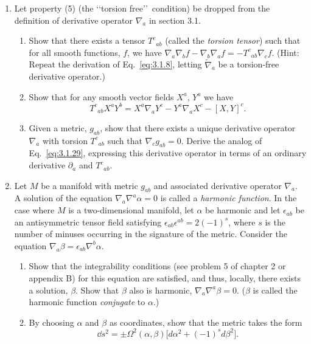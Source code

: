 
\chapterproblems

\begin{enumerate}[label=\arabic*.,leftmargin=*]
\item Let property (5) (the \lq\lq torsion free\rq\rq\ condition) be dropped from the definition of
derivative operator $\nabla_a$ in section 3.1.
  \begin{enumerate}[label=\alph*),leftmargin=2em]
  \item Show that there exists a tensor $T^c{}_{ab}$ (called the \emph{torsion tensor}) such that for all
  smooth functions, $f$, we have $\nabla_a\nabla_bf-\nabla_b\nabla_af=-T^c{}_{ab}\nabla_cf$.
  (Hint: Repeat the derivation of Eq.~\eqref{eq:3.1.8}, letting $\widetilde\nabla_a$ be a torsion-free
  derivative operator.)
  \item Show that for any smooth vector fields $X^a$, $Y^a$ we have
  \[
    T^c{}_{ab}X^aY^b=X^a\nabla_aY^c-Y^a\nabla_aX^c-[X,Y]^c.
  \]
  \item Given a metric, $g_{ab}$, show that there exists a unique derivative operator $\nabla_a$ with
  torsion $T^c{}_{ab}$ such that $\nabla_cg_{ab}=0$. Derive the analog of Eq.~\eqref{eq:3.1.29}, expressing
  this derivative operator in terms of an ordinary derivative $\partial_a$ and $T^c{}_{ab}$.
  \end{enumerate}

\item Let $M$ be a manifold with metric $g_{ab}$ and associated derivative operator $\nabla_a$. A
solution of the equation $\nabla_a\nabla^a\alpha=0$ is called a \emph{harmonic function}. In the case where
$M$ is a two-dimensional manifold, let $\alpha$ be harmonic and let $\epsilon_{ab}$ be an antisymmetric
tensor field satisfying $\epsilon_{ab}\epsilon^{ab}=2(-1)^s$, where $s$ is the number of minuses occurring
in the signature of the metric. Consider the equation $\nabla_a\beta=\epsilon_{ab}\nabla^b\alpha$.
  \begin{enumerate}[label=\alph*),leftmargin=2em]
  \item Show that the integrability conditions (see problem 5 of chapter 2 or appendix
  B) for this equation are satisfied, and thus, locally, there exists a solution, $\beta$. Show
  that $\beta$ also is harmonic, $\nabla_a\nabla^a\beta=0$. ($\beta$ is called the harmonic function
  \emph{conjugate} to $\alpha$.)
  \item By choosing $\alpha$ and $\beta$ as coordinates, show that the metric takes the form
  \[
    \dd s^2=\pm\Omega^2(\alpha,\beta)\bigl[d\alpha^2+(-1)^sd\beta^2\bigr].
  \]
  \end{enumerate}


\end{enumerate}

